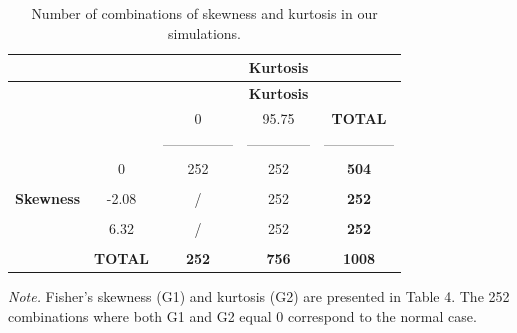 \documentclass[
  english,
  man,floatsintext]{apa6}
\begin{document}
\begin{longtable}[]{@{}ccccc@{}}
\caption{Number of combinations of skewness and kurtosis in our simulations.}\tabularnewline
\toprule
& & & \textbf{Kurtosis} & \\
\midrule
\endfirsthead
\toprule
& & & \textbf{Kurtosis} & \\
\midrule
\endhead
& & 0 & 95.75 & \textbf{TOTAL} \\
& & --------------- & -------------- & --------------- \\
& 0 & 252 & 252 & \textbf{504} \\
& & & & \\
\textbf{Skewness} & -2.08 & / & 252 & \textbf{252} \\
& & & & \\
& 6.32 & / & 252 & \textbf{252} \\
& & & & \\
& \textbf{TOTAL} & \textbf{252} & \textbf{756} & \textbf{1008} \\
\bottomrule
\end{longtable}

\emph{Note.} Fisher's skewness (G1) and kurtosis (G2) are presented in Table 4. The 252 combinations where both G1 and G2 equal 0 correspond to the normal case.
\end{document}
